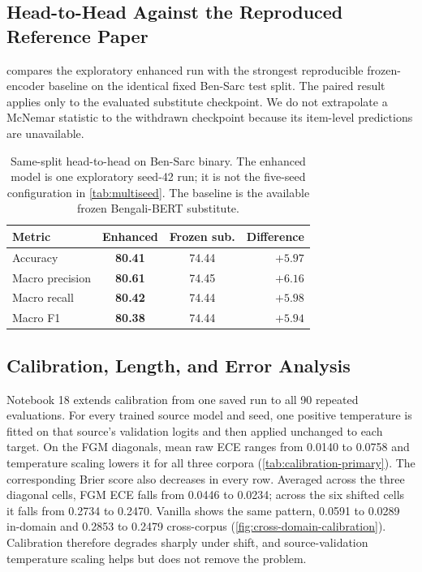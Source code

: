\documentclass{ieeeaccess}
\newcommand{\dset}[1]{#1}
\begin{document}
\subsection{Head-to-Head Against the Reproduced Reference Paper}
\label{sec:headtohead-results}

 compares the exploratory enhanced run with the strongest reproducible frozen-encoder baseline on the identical fixed Ben-Sarc test split. The paired result applies only to the evaluated substitute checkpoint. We do not extrapolate a McNemar statistic to the withdrawn checkpoint because its item-level predictions are unavailable.

\begin{table}[!t]
\centering
\caption{Same-split head-to-head on \dset{Ben-Sarc} binary. The enhanced model is one exploratory seed-42 run; it is not the five-seed configuration in \cref{tab:multiseed}. The baseline is the available frozen Bengali-BERT substitute.}
\label{tab:headtohead}
\footnotesize
\setlength{\tabcolsep}{2pt}
\begin{tabular}{@{}lccr@{}}
\toprule
\textbf{Metric} & \textbf{Enhanced} & \textbf{Frozen sub.} & \textbf{Difference} \\
\midrule
Accuracy & \textbf{80.41} & 74.44 & $+5.97$ \\
Macro precision & \textbf{80.61} & 74.45 & $+6.16$ \\
Macro recall & \textbf{80.42} & 74.44 & $+5.98$ \\
Macro F1 & \textbf{80.38} & 74.44 & $+5.94$ \\
\bottomrule
\end{tabular}
\end{table}

\subsection{Calibration, Length, and Error Analysis}
\label{sec:calibration-results}

Notebook 18 extends calibration from one saved run to all 90 repeated evaluations. For every trained source model and seed, one positive temperature is fitted on that source's validation logits and then applied unchanged to each target. On the FGM diagonals, mean raw ECE ranges from 0.0140 to 0.0758 and temperature scaling lowers it for all three corpora (\cref{tab:calibration-primary}). The corresponding Brier score also decreases in every row. Averaged across the three diagonal cells, FGM ECE falls from 0.0446 to 0.0234; across the six shifted cells it falls from 0.2734 to 0.2470. Vanilla shows the same pattern, 0.0591 to 0.0289 in-domain and 0.2853 to 0.2479 cross-corpus (\cref{fig:cross-domain-calibration}). Calibration therefore degrades sharply under shift, and source-validation temperature scaling helps but does not remove the problem.
\end{document}
